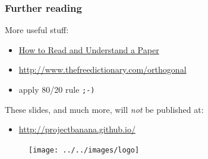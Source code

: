 \documentclass{beamer}
\begin{document}
\begin{frame}
\frametitle{Further reading}
More useful stuff:
\vspace{-0.4cm}
\begin{itemize}
 \item \href{http://eprints.ma.man.ac.uk/2484/01/covered/MIMS_ep2016_36.pdf}{How to Read and Understand a Paper}
 \item \url{http://www.thefreedictionary.com/orthogonal}
 \item apply 80/20 rule \texttt{;-)}
\end{itemize}

These slides, and much more, will \textit{not} be published at:
\vspace{-0.4cm}
\begin{itemize}
 \item \url{http://projectbanana.github.io/}
\end{itemize}
 \begin{figure}
\centering
 \texttt{[image: ../../images/logo]}
\end{figure}
\end{frame}
\end{document}
